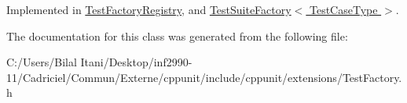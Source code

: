 Implemented in \hyperlink{class_test_factory_registry_a75fd01e6d565fb0f576ed1a887655089}{Test\+Factory\+Registry}, and \hyperlink{class_test_suite_factory_a0790b11de1543fa894acd7069fd1f327}{Test\+Suite\+Factory$<$ Test\+Case\+Type $>$}.



The documentation for this class was generated from the following file\+:\begin{DoxyCompactItemize}
\item 
C\+:/\+Users/\+Bilal Itani/\+Desktop/inf2990-\/11/\+Cadriciel/\+Commun/\+Externe/cppunit/include/cppunit/extensions/Test\+Factory.\+h\end{DoxyCompactItemize}
